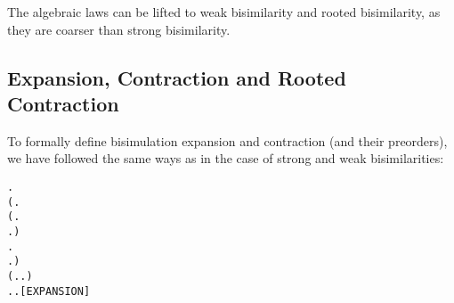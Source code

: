 The algebraic laws can be lifted to weak bisimilarity  and rooted 
 bisimilarity, as  they are coarser than   strong
bisimilarity.

\subsection{Expansion, Contraction and Rooted Contraction}

To formally define bisimulation expansion and contraction (and their preorders), we have
followed the same ways as in the case of strong and weak bisimilarities:
\begin{alltt}
  \HOLSymConst{\HOLTokenDefEquality{}}
  \HOLSymConst{\HOLTokenForall{}} .
         \HOLSymConst{\HOLTokenImp{}}
      (\HOLSymConst{\HOLTokenForall{}}.
           (\HOLSymConst{\HOLTokenForall{}}.
                 \HOLTokenTransBegin{} \HOLTokenTransEnd {} \HOLSymConst{\HOLTokenImp{}}
                \HOLSymConst{\HOLTokenExists{}}.  \HOLTokenTransBegin{} \HOLTokenTransEnd {} \HOLSymConst{\HOLTokenConj{}}   ) \HOLSymConst{\HOLTokenConj{}}
           \HOLSymConst{\HOLTokenForall{}}.
                \HOLTokenTransBegin{} \HOLTokenTransEnd {} \HOLSymConst{\HOLTokenImp{}}
               \HOLSymConst{\HOLTokenExists{}}.  \HOLTokenWeakTransBegin{} \HOLTokenImp{}  \HOLSymConst{\HOLTokenConj{}}   ) \HOLSymConst{\HOLTokenConj{}}
      (\HOLSymConst{\HOLTokenForall{}}.  \HOLTokenTransBegin\HOLSymConst{\ensuremath{\tau}}\HOLTokenTransEnd {} \HOLSymConst{\HOLTokenImp{}}    \HOLSymConst{\HOLTokenDisj{}} \HOLSymConst{\HOLTokenExists{}}.  \HOLTokenTransBegin\HOLSymConst{\ensuremath{\tau}}\HOLTokenTransEnd {} \HOLSymConst{\HOLTokenConj{}}   ) \HOLSymConst{\HOLTokenConj{}}
      \HOLSymConst{\HOLTokenForall{}}.  \HOLTokenTransBegin\HOLSymConst{\ensuremath{\tau}}\HOLTokenTransEnd {} \HOLSymConst{\HOLTokenImp{}} \HOLSymConst{\HOLTokenExists{}}.  \HOLTokenWeakTransBegin\HOLSymConst{\ensuremath{\tau}}\HOLTokenImp{}  \HOLSymConst{\HOLTokenConj{}}   \hfill{[EXPANSION]}


\end{alltt}

